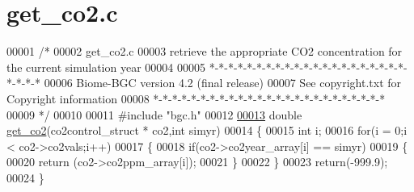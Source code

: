 \hypertarget{get__co2_8c_source}{}\section{get\+\_\+co2.\+c}
\label{get__co2_8c_source}

\begin{DoxyCode}
00001 \textcolor{comment}{/* }
00002 \textcolor{comment}{get\_co2.c}
00003 \textcolor{comment}{retrieve the appropriate CO2 concentration for the current simulation year}
00004 \textcolor{comment}{}
00005 \textcolor{comment}{*-*-*-*-*-*-*-*-*-*-*-*-*-*-*-*-*-*-*-*-*-*-*-*-*}
00006 \textcolor{comment}{Biome-BGC version 4.2 (final release)}
00007 \textcolor{comment}{See copyright.txt for Copyright information}
00008 \textcolor{comment}{*-*-*-*-*-*-*-*-*-*-*-*-*-*-*-*-*-*-*-*-*-*-*-*-*}
00009 \textcolor{comment}{*/}
00010 
00011 \textcolor{preprocessor}{#include "bgc.h"}
00012 
\hypertarget{get__co2_8c_source_l00013}{}\hyperlink{get__co2_8c_a90d651e65fc157ce30c88de9906e3af2}{00013} \textcolor{keywordtype}{double} \hyperlink{get__co2_8c_a90d651e65fc157ce30c88de9906e3af2}{get\_co2}(co2control\_struct * co2,\textcolor{keywordtype}{int} simyr)
00014 \{
00015     \textcolor{keywordtype}{int} i;
00016     \textcolor{keywordflow}{for}(i = 0;i < co2->co2vals;i++)
00017     \{
00018         \textcolor{keywordflow}{if}(co2->co2year\_array[i] == simyr)
00019         \{
00020             \textcolor{keywordflow}{return} (co2->co2ppm\_array[i]);
00021         \}
00022     \}
00023     \textcolor{keywordflow}{return}(-999.9);
00024 \}
\end{DoxyCode}
